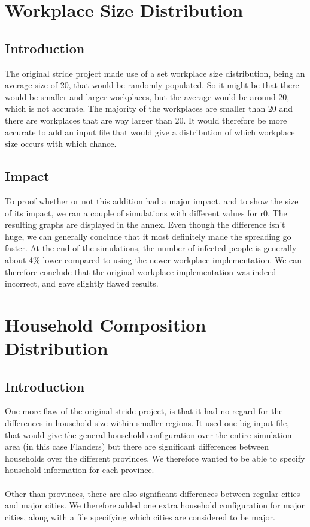 \documentclass[runningheads]{llncs}
\begin{document}
	\section{Workplace Size Distribution}
	\subsection{Introduction}
	The original stride project made use of a set workplace size distribution, being an average size of 20, that would be randomly populated. So it might be that there would be smaller and larger workplaces, but the average would be around 20, which is not accurate. The majority of the workplaces are smaller than 20 and there are workplaces that are way larger than 20. It would therefore be more accurate to add an input file that would give a distribution of which workplace size occurs with which chance.

	\subsection{Impact}
	To proof whether or not this addition had a major impact, and to show the size of its impact, we ran a couple of simulations with different values for r0. The resulting graphs are displayed in the annex. Even though the difference isn't huge, we can generally conclude that it most definitely made the spreading go faster. At the end of the simulations, the number of infected people is generally about 4\% lower compared to using the newer workplace implementation. We can therefore conclude that the original workplace implementation was indeed incorrect, and gave slightly flawed results.
	\section{Household Composition Distribution}
	\subsection{Introduction}
	One more flaw of the original stride project, is that it had no regard for the differences in household size within smaller regions. It used one big input file, that would give the general household configuration over the entire simulation area (in this case Flanders) but there are significant differences between households over the different provinces. We therefore wanted to be able to specify household information for each province. \\
	\\
	Other than provinces, there are also significant differences between regular cities and major cities. We therefore added one extra household configuration for major cities, along with a file specifying which cities are considered to be major.
\end{document}
